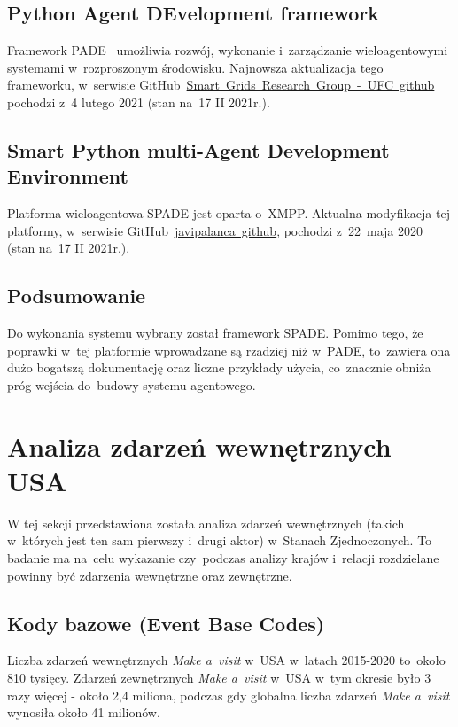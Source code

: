 \documentclass[11pt]{report}
\begin{document}
    \subsection{Python Agent DEvelopment framework}
    Framework PADE~\cite{Melo2019} umożliwia rozwój, wykonanie i~zarządzanie wieloagentowymi systemami w~rozproszonym środowisku.
    Najnowsza aktualizacja tego frameworku, w~serwisie GitHub~\href{https://github.com/grei-ufc/pade}{Smart~Grids~Research~Group~-~UFC~github} pochodzi z~4 lutego 2021 (stan na~17 II 2021r.).

    \subsection{Smart Python multi-Agent Development Environment}
    Platforma wieloagentowa SPADE jest oparta o~XMPP\cite{Saint-Andre2007}.
    Aktualna modyfikacja tej platformy, w~serwisie GitHub~\href{https://github.com/javipalanca/spade}{javipalanca~github}, pochodzi z~22~maja 2020 (stan na~17 II 2021r.).
    \enlargethispage{1\baselineskip}

    \subsection{Podsumowanie}
    Do wykonania systemu wybrany został framework SPADE\@.
    Pomimo tego, że poprawki w~tej platformie wprowadzane są rzadziej niż w~PADE, to~zawiera ona dużo bogatszą dokumentację
    oraz liczne przykłady użycia, co~znacznie obniża próg wejścia do~budowy systemu agentowego.


    \section{Analiza zdarzeń wewnętrznych USA}
    W tej sekcji przedstawiona została analiza zdarzeń wewnętrznych (takich w~których jest ten sam pierwszy i~drugi aktor) w~Stanach Zjednoczonych.
    To badanie ma na~celu wykazanie czy~podczas analizy krajów i~relacji rozdzielane powinny być zdarzenia wewnętrzne oraz zewnętrzne.

    \subsection{Kody bazowe (Event Base Codes)}\label{subsec:kody-bazowenullevent-base-codesnull}

    Liczba zdarzeń wewnętrznych \textit{Make a~visit} w~USA w~latach 2015-2020 to~około 810 tysięcy.
    Zdarzeń zewnętrznych \textit{Make a~visit} w~USA w~tym okresie było 3 razy więcej - około 2,4 miliona,
    podczas gdy globalna liczba zdarzeń \textit{Make a~visit} wynosiła około 41 milionów.
\end{document}
